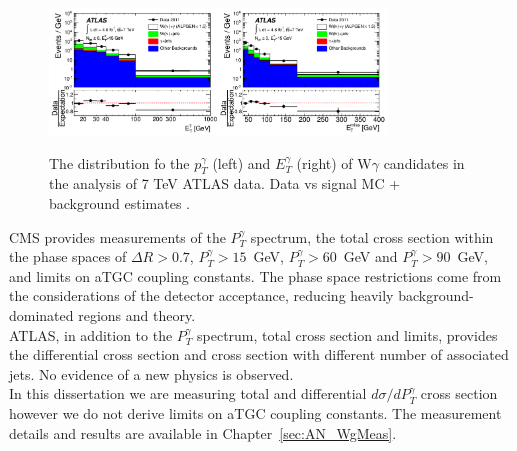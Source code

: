 \begin{figure}[htb]
  \begin{center}
    {\includegraphics[width=0.80\textwidth]{../figs/WgAbout/Wg7TeV_ATLAS_ptGamma.png}}
    \caption{The distribution fo the $p_T^\gamma$ (left) and $E_T^\gamma$ (right) of W$\gamma$ candidates in the analysis of 7 TeV ATLAS data. Data vs signal MC + background estimates \cite{ref_7TeV_ATLAS}. }
    \label{fig:Wg7TeV_ATLAS_ptGamma}
  \end{center}
\end{figure}

CMS provides measurements of the $P_T^\gamma$ spectrum, the total cross section within the phase spaces of $\Delta R>0.7$, $P_T^\gamma>15$~GeV, $P_T^\gamma>60$~GeV and $P_T^\gamma>90$~GeV, and limits on aTGC coupling constants. The phase space restrictions come from the considerations of the detector acceptance, reducing heavily background-dominated regions and theory.\\

ATLAS, in addition to the $P_T^\gamma$ spectrum, total cross section and limits, provides the differential cross section and cross section with different number of associated jets. No evidence of a new physics is observed.\\

In this dissertation we are measuring total and differential $d\sigma/d P_T^\gamma$ cross section however we do not derive limits on aTGC coupling constants. The measurement details and results are available in Chapter~\ref{sec:AN_WgMeas}.\\
